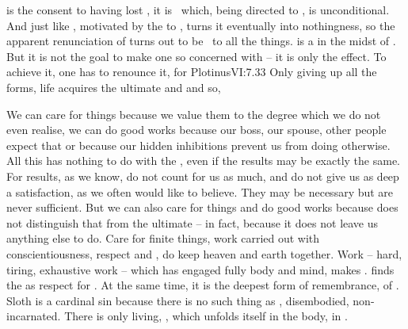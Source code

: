 \pa \label{pa:hardwork}  is the consent to
having lost , it is \yes\ which, being directed to
, is unconditional. And just like \No, motivated by the
 to , turns it eventually into nothingness, so the
apparent renunciation of  turns out to be  \yes\ to all the
 things.
%
 is a  in the midst of .
But it is not the goal to make one so concerned with  -- it is
only the effect. To achieve it, one has to renounce it, for \citet{the Supreme
  for which the soul hungers though unable to tell why such a being should stir
  its longing-reason, however, urging that This at last is the Authentic Term
  because the Nature best and most to be loved may be found there only where
  there is no least touch of Form.}{Plotinus}{VI:7.33} Only giving up all the
forms, life acquires the ultimate and  and so,

We can care for things because we value them to the degree which we do
not even realise, we can do good works because our boss, our spouse,
other people expect that or because our hidden inhibitions prevent us from 
doing otherwise. All this has nothing to do with the , even if the
 results may be exactly the same. For
 results, as we know, do not count for us as much, and do
not give us as deep a satisfaction, as we often would like to
believe. They may be necessary but are never sufficient.  But we can
also care for things and do good works because  does not
distinguish that from the ultimate  -- in fact, because
it does not leave us anything else to do.  Care for finite things,
work carried out with conscientiousness, respect and , do
keep heaven and earth together. Work -- hard, tiring, exhaustive work
-- which has engaged fully body and mind, makes .  finds the  as respect for
. At the same time, it is the deepest form of
remembrance,  of .  Sloth is a cardinal
sin because there is no such thing as , disembodied,
non-incarnated. There is only living, , which
unfolds itself in the body, in .

